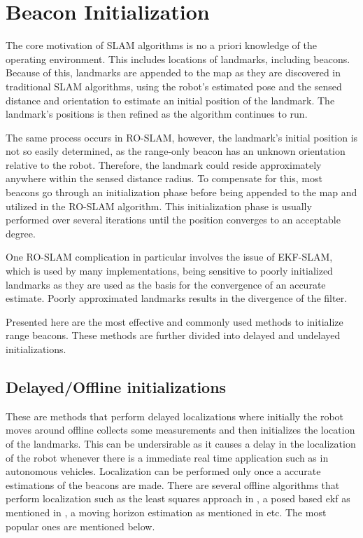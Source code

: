 \documentclass[conference]{IEEEtran}
\begin{document}
			

	\section{Beacon Initialization}
		\label{beacon initialization}
		The core motivation of SLAM algorithms is no a priori knowledge of the operating environment. This includes locations of landmarks, including beacons. Because of this, landmarks are appended to the map as they are discovered in traditional SLAM algorithms, using the robot's estimated pose and the sensed distance and orientation to estimate an initial position of the landmark. The landmark's positions is then refined as the algorithm continues to run.
		
		The same process occurs in RO-SLAM, however, the landmark's initial position is not so easily determined, as the range-only beacon has an unknown orientation relative to the robot. Therefore, the landmark could reside approximately anywhere within the sensed distance radius. To compensate for this, most beacons go through an initialization phase before being appended to the map and utilized in the RO-SLAM algorithm. This initialization phase is usually performed over several iterations until the position converges to an acceptable degree.
		
		One RO-SLAM complication in particular involves the issue of EKF-SLAM, which is used by many implementations, being  sensitive to poorly initialized landmarks as they are used as the basis for the convergence of an accurate estimate. Poorly approximated landmarks results in the divergence of the filter. 
		
		Presented here are the most effective and commonly used methods to initialize range beacons. These methods are further divided into delayed and undelayed initializations.
		
		\subsection{Delayed/Offline initializations}
			These are methods that perform delayed localizations  where initially the robot moves around offline collects some measurements and then initializes the location of the landmarks. This can be undersirable as it causes a delay in the localization of the robot whenever there is a immediate real time application such as in autonomous vehicles. Localization can be performed only once a accurate estimations of the beacons are made. There are several offline algorithms that perform localization such as the least squares approach in \cite{Newman}, a posed based ekf as mentioned in \cite{Webster2012}, a moving horizon estimation as mentioned in \cite{Vallicrosa2014a} etc. The most popular ones are mentioned below.
\end{document}

